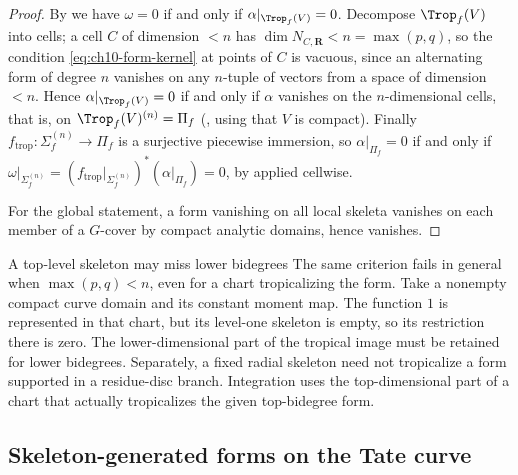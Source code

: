 \begin{proof}
By  we have $\omega=0$ if and only if
$\alpha|_{\Trop_f(V)}=0$.  Decompose $\Trop_f(V)$ into cells; a cell $C$ of
dimension $<n$ has $\dim N_{C,\mathbf R}<n=\max(p,q)$, so the condition
\eqref{eq:ch10-form-kernel} at points of $C$ is vacuous, since an
alternating form of degree $n$ vanishes on any $n$-tuple of vectors from a
space of dimension $<n$.  Hence $\alpha|_{\Trop_f(V)}=0$ if and only if
$\alpha$ vanishes on the $n$-dimensional cells, that is, on
$\Trop_f(V)^{(n)}=\Pi_f$ (, using that
$V$ is compact).  Finally
$f_{\mathrm{trop}}:\Sigma_f^{(n)}\to\Pi_f$ is a surjective piecewise
immersion, so $\alpha|_{\Pi_f}=0$ if and only if
$\omega|_{\Sigma_f^{(n)}}=(f_{\mathrm{trop}}|_{\Sigma_f^{(n)}})^*
(\alpha|_{\Pi_f})=0$, by
 applied cellwise.

For the global statement, a form vanishing on all local skeleta vanishes on
each member of a $G$-cover by compact analytic domains, hence vanishes.
\end{proof}

\begin{warning}{A top-level skeleton may miss lower bidegrees}
The same criterion fails in general when $\max(p,q)<n$, even for a
chart tropicalizing the form.  Take a nonempty compact curve domain
and its constant moment map.  The function $1$ is represented in that
chart, but its level-one skeleton is empty, so its restriction there
is zero.  The lower-dimensional part of the tropical image must be
retained for lower bidegrees.  Separately, a fixed radial skeleton
need not tropicalize a form supported in a residue-disc branch.
Integration uses the top-dimensional part of a chart that actually
tropicalizes the given top-bidegree form.
\end{warning}

\subsection{Skeleton-generated forms on the Tate curve}

